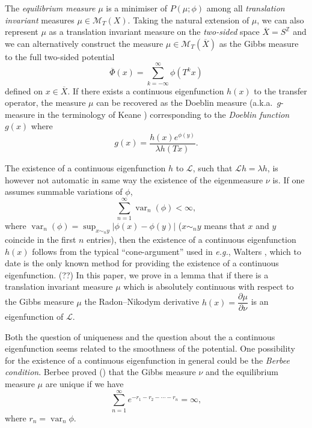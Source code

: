 \documentclass[11pt, a4paper]{amsart}
\theoremstyle{definition}
\theoremstyle{remark}
\providecommand{\ZZ}{\mathbb{Z}}
\providecommand{\CM}{\mathscr{M}}
\providecommand{\mscr}{\mathscr}
\providecommand{\mc}{\mathcal}
\providecommand{\opn}{\operatorname}
\providecommand{\ol}{\overline}
\providecommand{\var}{\opn{var}}
\def\X{X}
\def\T{T}
\begin{document}
The \emph{equilibrium measure} $\mu$ is a minimiser of $P(\mu;\phi)$ among all
\emph{translation invariant} measures $\mu\in{\CM}_\T(\X)$. Taking the natural
extension of $\mu$, we can also represent $\mu$ as a translation invariant measure
on the \emph{two-sided} space $\ol\X = S^\ZZ$ and we can alternatively construct
the measure $\mu\in\CM_\T(\ol\X)$ as the Gibbs measure to the full two-sided potential
\[
  \ol \Phi(x)=\sum_{k=-\infty}^\infty \phi(\T^k x)
\]
defined on $x\in\ol\X$.
If there exists a continuous eigenfunction $h(x)$ to the transfer operator, the
measure $\mu$ can be recovered as the Doeblin measure \cite{berger2} (a.k.a.\
$g$-measure in the terminology of Keane \cite{keane}) corresponding to the
\emph{Doeblin function} $g(x)$ where
\begin{equation}\label{g}
  g(x)= \frac{h(x) e^{\phi(y)}}{\lambda h(\T x)}.
\end{equation}

The existence of a continuous eigenfunction $h$ to $\mc{L}$, such that
$\mc{L}h=\lambda h$, is however not automatic in same way the existence of the
eigenmeasure $\nu$ is. If one assumes summable variations of $\phi$,
\begin{equation}\label{sum}
  \sum_{n=1}^\infty \var_n (\phi)<\infty,
\end{equation}
where $\var_n(\phi)=\sup_{x\sim_n y}|\phi(x)-\phi(y)|$ ($x\sim_n y$ means that $x$ and $y$
coincide in the first $n$ entries), then the existence of a continuous
eigenfunction $h(x)$ follows from the typical ``cone-argument'' used in {\em
  e.g.}, Walters \cite{walters1}, which to date is the only known method for
providing the existence of a continuous eigenfunction. (??) In this paper, we
prove in a lemma that if there is a translation invariant measure $\mu$ which is
absolutely continuous with respect to the Gibbs measure $\mu$ the Radon--Nikodym
derivative $h(x)=\dfrac{\partial\mu}{\partial\nu}$ is an eigenfunction of $\mscr L$.

Both the question of uniqueness and the question about the a continuous
eigenfunction seems related to the smoothness of the potential. One possibility
for the existence of a continuous eigenfunction in general could be the
\emph{Berbee condition}. Berbee proved (\cite{berbee89}) that the Gibbs measure
$\nu$ and the equilibrium measure $\mu$ are unique if we have
\begin{equation}\label{berbee}
  \sum_{n=1}^\infty e^{-r_1-r_2-\cdots-r_n}=\infty,
\end{equation}
where $r_n=\var_n \phi$.
\end{document}
